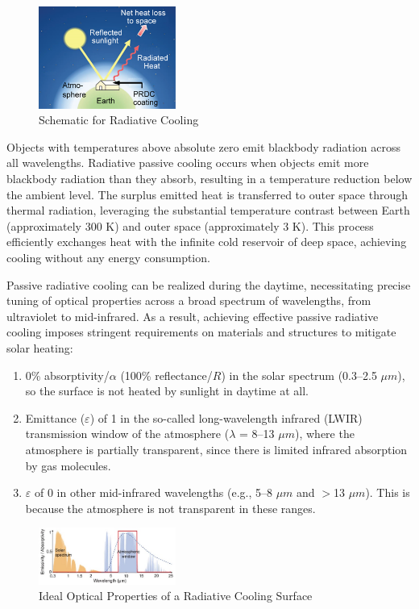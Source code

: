 \begin{figure}
  \centering
  \includegraphics[width=0.4\textwidth]{Chapters/Figures/Schematic for Radiative Cooling.png}
  \caption{Schematic for Radiative Cooling}
\end{figure}
Objects with temperatures above absolute zero emit blackbody radiation across all wavelengths. Radiative passive cooling occurs when objects emit more blackbody radiation than they absorb, resulting in a temperature reduction below the ambient level. The surplus emitted heat is transferred to outer space through thermal radiation, leveraging the substantial temperature contrast between Earth (approximately 300 K) and outer space (approximately 3 K). This process efficiently exchanges heat with the infinite cold reservoir of deep space, achieving cooling without any energy consumption. %

Passive radiative cooling can be realized during the daytime, necessitating precise tuning of optical properties across a broad spectrum of wavelengths, from ultraviolet to mid-infrared. As a result, achieving effective passive radiative cooling imposes stringent requirements on materials and structures to mitigate solar heating: %

\begin{enumerate}
\item 0\% absorptivity/$\alpha$ (100\% reflectance/$R$) in the solar spectrum (0.3–2.5 $\mu m$), so the surface is not heated by sunlight in daytime at all.
\item Emittance ($\varepsilon$) of 1 in the so-called long-wavelength infrared (LWIR) transmission window of the atmosphere ($\lambda$ = 8–13 $\mu m$), where the atmosphere is partially transparent, since there is limited infrared absorption by gas molecules.
\item $\varepsilon$ of 0 in other mid-infrared wavelengths (e.g., 5–8 $\mu m$ and $>$13 $\mu m$). This is because the atmosphere is not transparent in these ranges.
\end{enumerate}

\begin{figure}
  \centering
  \includegraphics[width=0.4\textwidth]{Chapters/Figures/Ideal Optical Properties of a Radiative Cooling Surface.jpg}
  \caption{Ideal Optical Properties of a Radiative Cooling Surface}
\end{figure}

